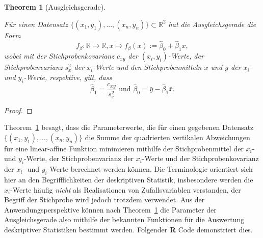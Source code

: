 \documentclass[
  letterpaper,
  DIV=11]{scrartcl}
\theoremstyle{plain}
\newtheorem{theorem}{Theorem}[section]
\theoremstyle{definition}
\theoremstyle{remark}
\begin{document}
\begin{theorem}[Ausgleichsgerade]\protect\hypertarget{thm-ausgleichsgerade}{}\label{thm-ausgleichsgerade}

Für einen Datensatz \(\{(x_1,y_1),...,(x_n,y_n)\}\subset\mathbb{R}^2\)
hat die Ausgleichsgerade die Form \begin{equation}
f_\beta : \mathbb{R} \to \mathbb{R}, x \mapsto f_\beta(x) := \hat{\beta}_0 + \hat{\beta}_1 x,
\end{equation} wobei mit der Stichprobenkovarianz \(c_{xy}\) der
\((x_i,y_i)\)-Werte, der Stichprobenvarianz \(s_x^2\) der \(x_i\)-Werte
und den Stichprobenmitteln \(\bar{x}\) und \(\bar{y}\) der \(x_i\)- und
\(y_i\)-Werte, respektive, gilt, dass \begin{equation}
\hat{\beta}_1 = \frac{c_{xy}}{s_x^2} \mbox{ und } \hat{\beta}_0 = \bar{y} - \hat{\beta}_1\bar{x}.
\end{equation}

\end{theorem}

\begin{proof}

\end{proof}

Theorem~\ref{thm-ausgleichsgerade} besagt, dass die Parameterwerte, die
für einen gegebenen Datensatz \(\{(x_1,y_1),...,(x_n,y_n)\}\) die Summe
der quadrierten vertikalen Abweichungen für eine linear-affine Funktion
minimieren mithilfe der Stichprobenmittel der \(x_i\)- und
\(y_i\)-Werte, der Stichprobenvarianz der \(x_i\)-Werte und der
Stichprobenkovarianz der \(x_i\)- und \(y_i\)-Werte berechnet werden
können. Die Terminologie orientiert sich hier an den Begrifflichkeiten
der deskriptiven Statistik, insbesondere werden die \(x_i\)-Werte häufig
\emph{nicht} als Realisationen von Zufallsvariablen verstanden, der
Begriff der Stichprobe wird jedoch trotzdem verwendet. Aus der
Anwendungsperspektive können nach Theorem~\ref{thm-ausgleichsgerade} die
Parameter der Ausgleichsgerade also mithilfe der bekannten Funktionen
für die Auswertung deskriptiver Statistiken bestimmt werden. Folgender
\textbf{R} Code demonstriert dies.

\tiny
\end{document}
